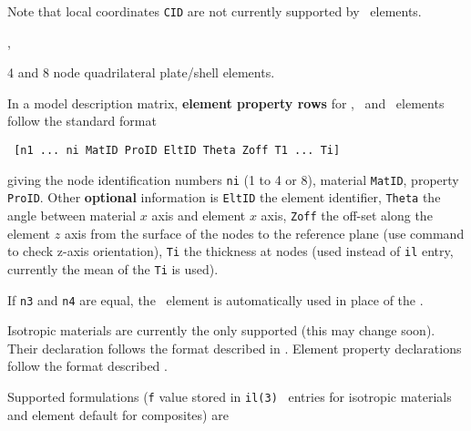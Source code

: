 Note that local coordinates {\tt CID} are not currently supported by \massb\ elements.


\femesh, \feplot


4 and 8 node quadrilateral plate/shell elements.



In a model description matrix, {\bf element property rows} for \quada, \quadb\ and \quadc\ elements follow the standard format

\begin{verbatim}
 [n1 ... ni MatID ProID EltID Theta Zoff T1 ... Ti] 
\end{verbatim}


giving the node identification numbers {\tt ni} (1 to 4 or 8), material {\tt MatID}, property {\tt ProID}. Other {\bf optional} information is {\tt EltID} the element identifier, {\tt Theta} the angle between material $x$ axis and element $x$ axis, {\tt Zoff} the off-set along the element $z$ axis from the surface of the nodes to the reference plane (use  command to check z-axis orientation), {\tt Ti} the thickness at nodes (used instead of {\tt il} entry, currently the mean of the {\tt Ti} is used). \par

If {\tt n3} and {\tt n4} are equal, the \triaa\ element is automatically used in place of the \quada.

Isotropic materials are currently the only supported (this may change soon). Their declaration follows the format described in \melastic.
Element property declarations follow the format described \pshell.


Supported formulations ({\tt f} value stored in {\tt il(3)} \pshell\ entries for isotropic materials and element default for composites) are 

